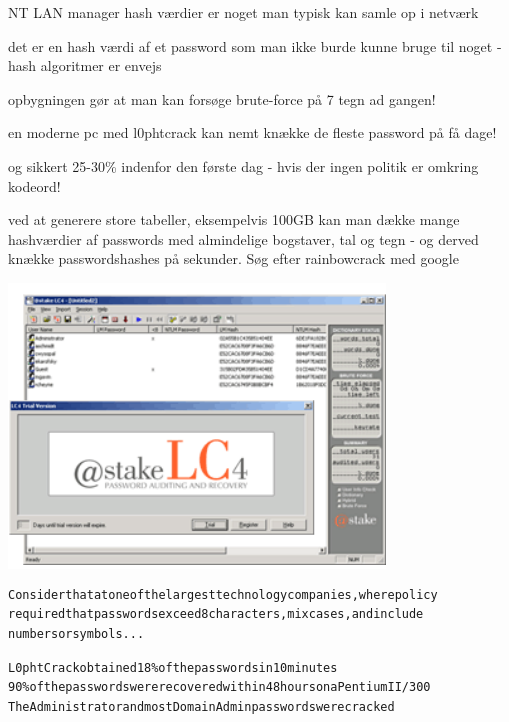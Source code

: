 \documentclass[20pt,landscape,a4paper,footrule]{foils}
\begin{document}
\begin{list1}
  \item NT LAN manager hash værdier er noget man typisk kan samle op i
  netværk 
\item det er en hash værdi af et password som man ikke burde kunne
  bruge til noget - hash algoritmer er envejs
\item opbygningen gør at man kan forsøge brute-force på 7 tegn ad
  gangen!
\item en moderne pc med l0phtcrack kan nemt knække de fleste password
  på få dage!
\item og sikkert 25-30\% indenfor den første dag - hvis der ingen
  politik er omkring kodeord! 
\item ved at generere store tabeller, eksempelvis 100GB kan man dække
  mange hashværdier af passwords med almindelige bogstaver, tal og
  tegn - og derved knække passwordshashes på sekunder. Søg efter
  rainbowcrack med google
\end{list1}

\begin{center}
\colorbox{white}{\includegraphics[width=10cm]{images/lc4_splash.png}}  
\end{center}

\begin{alltt}
\small
Consider that at one of the largest technology companies, where policy
required that passwords exceed 8 characters, mix cases, and include
numbers or symbols...   
        
L0phtCrack obtained 18\% of the passwords in 10 minutes         
90\% of the passwords were recovered within 48 hours on a Pentium II/300           
The Administrator and most Domain Admin passwords were cracked 
\end{alltt}
\end{document}
